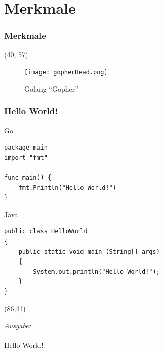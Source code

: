 \documentclass{beamer}
\begin{document}

\section{Merkmale}
\begin{frame}
\frametitle{Merkmale}

\begin{textblock}{50}(40, 57)
\begin{figure}
\caption{Golang ``Gopher''}
\texttt{[image: gopherHead.png]}
\end{figure}
\end{textblock}

\end{frame}


\begin{frame}[fragile]
\frametitle{Hello World!}

Go
\begin{lstlisting}
package main
import "fmt"

func main() {
    fmt.Println("Hello World!")
}
\end{lstlisting}

Java
\lstset{language=Java}
\begin{lstlisting}
public class HelloWorld 
{ 
    public static void main (String[] args)
    {
        System.out.println("Hello World!");
    }
}
\end{lstlisting}

\begin{textblock}{32}(86,41)
\begin{tcolorbox}
\textit{Ausgabe:\\}\\
Hello World!
\end{tcolorbox}
\end{textblock}

\end{frame}

\end{document}
